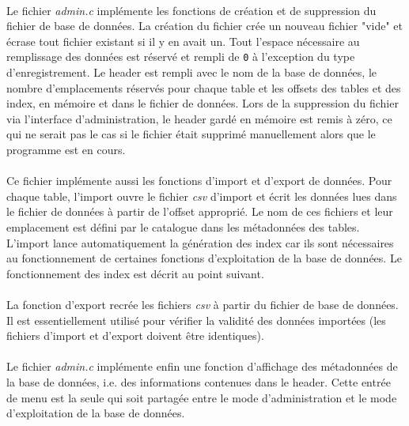 \documentclass{article}
\begin{document}
    \paragraph{}
    Le fichier \emph{admin.c} implémente les fonctions de création et de suppression du fichier de base de données. La création du fichier crée un nouveau fichier "vide" et écrase tout fichier existant si il y en avait un. Tout l'espace nécessaire au remplissage des données est réservé et rempli de \texttt{0} à l'exception du type d'enregistrement. Le header est rempli avec le nom de la base de données, le nombre d'emplacements réservés pour chaque table et les offsets des tables et des index, en mémoire et dans le fichier de données. Lors de la suppression du fichier via l'interface d'administration, le header gardé en mémoire est remis à zéro, ce qui ne serait pas le cas si le fichier était supprimé manuellement alors que le programme est en cours.

    \paragraph{}
    Ce fichier implémente aussi les fonctions d'import et d'export de données. Pour chaque table, l'import ouvre le fichier \emph{csv} d'import et écrit les données lues dans le fichier de données à partir de l'offset approprié. Le nom de ces fichiers et leur emplacement est défini par le catalogue dans les métadonnées des tables. L'import lance automatiquement la génération des index car ils sont nécessaires au fonctionnement de certaines fonctions d'exploitation de la base de données. Le fonctionnement des index est décrit au point suivant.

    \paragraph{}
    La fonction d'export recrée les fichiers \emph{csv} à partir du fichier de base de données. Il est essentiellement utilisé pour vérifier la validité des données importées (les fichiers d'import et d'export doivent être identiques).

    \paragraph{}
    Le fichier \emph{admin.c} implémente enfin une fonction d'affichage des métadonnées de la base de données, i.e. des informations contenues dans le header. Cette entrée de menu est la seule qui soit partagée entre le mode d'administration et le mode d'exploitation de la base de données.
\end{document}
